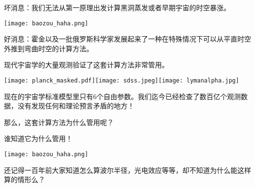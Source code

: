 \documentclass[CJK]{beamer}
\begin{document}
\begin{frame}
\bch
\begin{minipage}{0.6\textwidth}
坏消息：我们无法从第一原理出发计算黑洞蒸发或者早期宇宙的时空暴涨。
\end{minipage}
\begin{minipage}{0.3\textwidth}
\texttt{[image: baozou\_haha.png]}
\end{minipage}

\skipline
\skipline

好消息：霍金以及一批俄罗斯科学家发展起来了一种在特殊情况下可以从平直时空外推到弯曲时空的计算方法。
\ech
\end{frame}


\begin{frame}
\bch
现代宇宙学的大量观测验证了这套计算方法非常管用。

\texttt{[image: planck\_masked.pdf]}\texttt{[image: sdss.jpeg]}\texttt{[image: lymanalpha.jpg]}

现在的宇宙学标准模型里只有6个自由参数。我们迄今已经检查了数百亿个观测数据，没有发现任何和理论预言矛盾的地方！

\skipline
\skipline
那么，这套计算方法为什么管用呢？
\ech
\end{frame}


\begin{frame}
\bch
\begin{minipage}{0.6\textwidth}
谁知道它为什么管用！
\end{minipage}
\begin{minipage}{0.3\textwidth}
\texttt{[image: baozou\_haha.png]}
\end{minipage}

\skipline
\skipline
\skipline
\skipline
还记得一百年前大家知道怎么算波尔半径，光电效应等等，却不知道为什么能这样算的情形么？
\ech
\end{frame}

\end{document}
